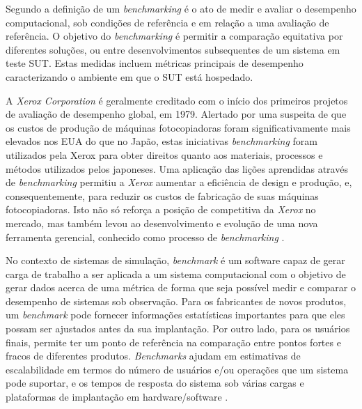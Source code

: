 Segundo  a definição de um \textit{benchmarking} é o ato de medir e avaliar o desempenho computacional, sob condições de referência e em relação a uma avaliação de referência. O objetivo do \textit{benchmarking} é permitir a comparação equitativa por diferentes soluções, ou entre desenvolvimentos subsequentes de um sistema em teste SUT. Estas medidas incluem métricas principais de desempenho caracterizando o ambiente em que o SUT está hospedado.

A \textit{Xerox Corporation} é geralmente creditado com o início dos primeiros projetos de avaliação de desempenho global, em 1979. Alertado por uma suspeita de que os custos de produção de máquinas fotocopiadoras foram significativamente mais elevados nos EUA do que no Japão, estas iniciativas \textit{benchmarking} foram utilizados pela Xerox para obter direitos quanto aos materiais, processos e métodos utilizados pelos japoneses. Uma aplicação das lições aprendidas através de \textit{benchmarking} permitiu a \textit{Xerox} aumentar a eficiência de design e produção, e, consequentemente, para reduzir os custos de fabricação de suas máquinas fotocopiadoras. Isto não só reforça a posição de competitiva da \textit{Xerox} no mercado, mas também levou ao desenvolvimento e evolução de uma nova ferramenta gerencial, conhecido como processo de \textit{benchmarking} \cite{Mahmoud2002}.

No contexto de sistemas de simulação, \textit{benchmark} é um software capaz de gerar carga de trabalho a ser aplicada a um sistema computacional com o objetivo de gerar dados acerca de uma métrica de forma que seja possível medir e comparar o desempenho de sistemas sob observação. Para os fabricantes de novos produtos, um \textit{benchmark} pode fornecer informações estatísticas importantes para que eles possam ser ajustados antes da sua implantação. Por outro lado, para os usuários finais, permite ter um ponto de referência na comparação entre pontos fortes e fracos de diferentes produtos. \textit{Benchmarks} ajudam em estimativas de escalabilidade em termos do número de usuários e/ou operações que um sistema pode suportar, e os tempos de resposta do sistema sob várias cargas e plataformas de implantação em hardware/software \cite{Jutla1999}.

